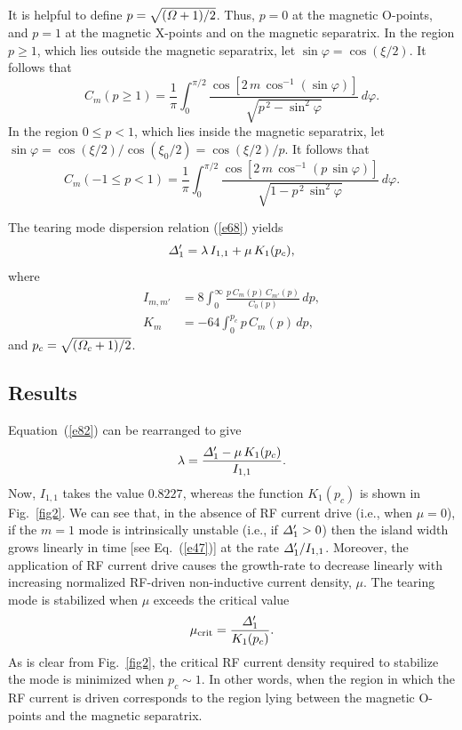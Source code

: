 \documentclass[12pt,prb,aps]{revtex4-1}
\begin{document}
It is helpful to define $p = \sqrt{({\mit\Omega}+	1)/2}$. Thus, $p=0$ at the magnetic O-points, and $p=1$ at the
magnetic X-points and on the magnetic separatrix. In the region $p\geq1$, which lies outside the magnetic separatrix, let $\sin\varphi = \cos(\xi/2)$. 
It follows that 
\begin{equation}
 C_m(p\geq 1)=\frac{1}{\pi} \int_{0}^{\pi/2}\frac{\cos[2\,m\,\cos^{-1}(\sin\varphi)]}
 {\sqrt{p^{\,2}-\sin^2\varphi}}\,d\varphi.
\end{equation}
In the region $0\leq p< 1$, which lies inside the magnetic separatrix, let 
$\sin\varphi = \cos(\xi/2)/\cos(\xi_0/2)=\cos(\xi/2)/p$.
 It follows that 
\begin{equation}
 C_m(-1\leq p< 1)=\frac{1}{\pi} \int_{0}^{\pi/2}\frac{\cos[2\,m\,\cos^{-1}(p\,\sin\varphi)]}
 {\sqrt{1-p^{\,2}\,\sin^2\varphi}}\,d\varphi.
\end{equation}

The tearing mode dispersion relation (\ref{e68}) yields
\begin{equation}\label{e82}
{\mit\Delta}_1' = \lambda\,I_{1,1}+\mu\,K_1(p_c),
\end{equation}
where
\begin{align}
I_{m,m'} &= 8\int_0^\infty\frac{p\,C_m(p)\,C_{m'}(p)}{C_0(p)}\,dp,\\[0.5ex]
K_m &= -64 \int_0^{p_c} p\,C_m(p)\,dp,\label{e84}
\end{align}
and $p_c= \sqrt{({\mit\Omega}_c+1)/2}$. 

\subsection{Results}
Equation~(\ref{e82}) can be rearranged to give
\begin{equation}
\lambda = \frac{{\mit\Delta}_1'-\mu\,K_1(p_c)}{I_{1,1}}.
\end{equation}
Now, $I_{1,1}$ takes the value $0.8227$,\cite{ruth} whereas the function $K_1(p_c)$ is shown in Fig.~\ref{fig2}. 
We can see that, in the absence of RF current drive (i.e., when $\mu=0$), if the $m=1$ mode is intrinsically unstable (i.e., if ${\mit\Delta}_1'> 0$) then the island width grows linearly in time  [see Eq.~(\ref{e47})] at the rate ${\mit\Delta}_1'/I_{1,1}$.\cite{ruth}
Moreover, the application of RF  current drive causes the growth-rate to decrease linearly with
increasing normalized RF-driven non-inductive current density, $\mu$. The tearing mode is stabilized when $\mu$ exceeds the critical value
\begin{equation}
\mu_{\rm crit} =\frac{{\mit\Delta}_1'}{K_1(p_c)}.
\end{equation}
As is clear from Fig.~\ref{fig2}, the critical RF current density required to stabilize the mode is minimized when $p_c\sim 1$. In other words, when the region in which the RF current is driven corresponds to the region lying between the magnetic O-points and the magnetic separatrix.  
\end{document}
